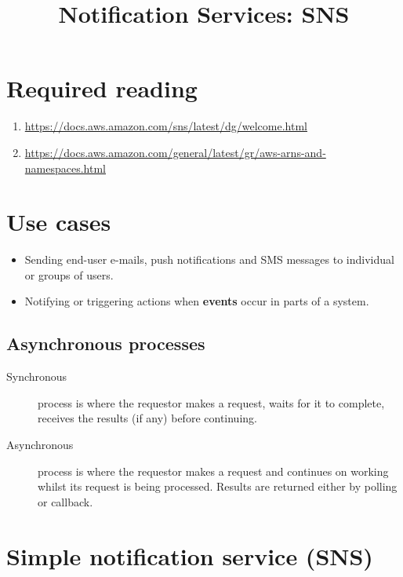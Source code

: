 \documentclass{pgnotes}
\title{Notification Services: SNS}
\begin{document}
\maketitle

\section*{Required reading}\label{required-reading}

\begin{enumerate}
\def\labelenumi{\arabic{enumi}.}
\item
  \url{https://docs.aws.amazon.com/sns/latest/dg/welcome.html}
\item
  \url{https://docs.aws.amazon.com/general/latest/gr/aws-arns-and-namespaces.html}
\end{enumerate}

\section{Use cases}\label{use-cases}

\begin{itemize}
\item
  Sending end-user e-mails, push notifications and SMS messages to
  individual or groups of users.
\item
  Notifying or triggering actions when \textbf{events} occur in parts of
  a system.
\end{itemize}

\subsection{Asynchronous processes}\label{asynchronous-processes}

\begin{description}
\item[Synchronous]
process is where the requestor makes a request, waits for it to
complete, receives the results (if any) before continuing.
\item[Asynchronous]
process is where the requestor makes a request and continues on working
whilst its request is being processed. Results are returned either by
polling or callback.
\end{description}

\section{Simple notification service
(SNS)}\label{simple-notification-service-sns}
\end{document}
